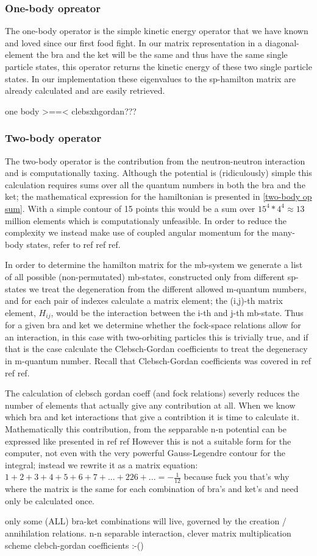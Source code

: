 \subsubsection{One-body opreator}
The one-body operator is the simple kinetic energy operator that we have known and loved since our first food fight. 
In our matrix representation in a diagonal-element the bra and the ket will be the same and thus have the same single particle states, this operator returns the kinetic energy of these two single particle states. 
In our implementation these eigenvalues to the sp-hamilton matrix are already calculated and are easily retrieved.

one body >==< clebsxhgordan???
\subsubsection{Two-body operator}
The two-body operator is the contribution from the neutron-neutron interaction and is computationally taxing. Although the potential is (ridiculously) simple this calculation requires sums over all the quantum numbers in both the bra and the ket; the mathematical expression for the hamiltonian is presented in \ref{two-body op sum}. 
With a simple contour of 15 points this would be a sum over $15^4*4^4 \approx 13$ million elements which is computationaly unfeasible.
In order to reduce the complexity we instead make use of coupled angular momentum for the many-body states, refer to ref ref ref.

In order to determine the hamilton matrix for the mb-system we generate a list of all possible (non-permutated) mb-states, constructed only from different sp-states we treat the degeneration from the different allowed m-quantum numbers, and for each pair of indexes calculate a matrix element; the (i,j)-th matrix element, $H_{ij}$, would be the interaction between the i-th and j-th mb-state. 
Thus for a given bra and ket we determine whether the fock-space relations allow for an interaction, in this case with two-orbiting particles this is trivially true, and if that is the case calculate the Clebsch-Gordan coefficients to treat the degeneracy in m-quantum number. 
Recall that Clebsch-Gordan coefficients was covered in ref ref ref.

The calculation of clebsch gordan coeff (and fock relations) severly reduces the number of elements that actually give any contribution at all. 
When we know which bra and ket interactions that give a contribtion it is time to calculate it. 
Mathematically this contribution, from the sepparable n-n potential can be expressed like presented in ref ref
However this is not a suitable form for the computer, not even with the very powerful Gauss-Legendre contour for the integral; instead we rewrite it as a matrix equation:
$1+2+3+4+5+6+7+...+226+... = - \frac{1}{12}$ because fuck you that's why\\
where the matrix is the same for each combination of bra's and ket's and need only be calculated once.

only some (ALL) bra-ket combinations will live, governed by the creation / annihilation relations. 
n-n separable interaction, clever matrix multiplication scheme
clebch-gordan coefficients :-()